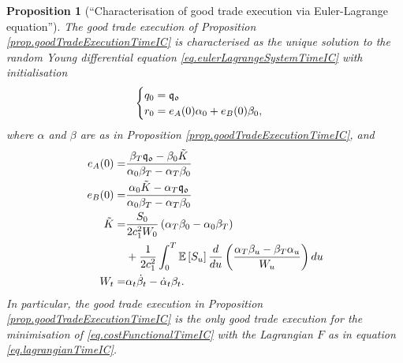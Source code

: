 \documentclass[10pt,a4paper]{article}
\newtheorem{prop}[thm]{Proposition}
\begin{document}
	\begin{prop} [``Characterisation of good trade execution via Euler-Lagrange equation''] \label{prop.characterisationEulerLagrangeTimeIC}
		The good trade execution of Proposition \ref{prop.goodTradeExecutionTimeIC} is characterised as the unique solution to the random Young differential equation \eqref{eq.eulerLagrangeSystemTimeIC} with initialisation
		\begin{equation*}
		\begin{cases}
		q_0 = \mathfrak{q_0} \\
		r_0 = e_A(0) \alpha_0 + e_B (0) \beta_0,
		\end{cases}
		\end{equation*}
		where $\alpha$ and $\beta$ are as in Proposition \ref{prop.goodTradeExecutionTimeIC}, and 
		\begin{equation*}
		\begin{split}
		e_A (0) =& \frac{ \beta_T \mathfrak{q_0} - \beta_0 \tilde{K}}{\alpha_0\beta_T - \alpha_T \beta_0} \\
		e_B (0) =& \frac{\alpha_0 \tilde{K} - \alpha_T \mathfrak{q_0}}{\alpha_0\beta_T - \alpha_T \beta_0} \\
		\tilde{K} = & \frac{S_0}{2c_{1}^{2} W_0}\left(\alpha_T \beta_0 - \alpha_0 \beta_T \right) \\
		& + \frac{1}{2c_{1}^{2}} \int_{0}^{T} \mathbb{{E}}\left[S_u\right] 
		\frac{d}{d u} \left(\frac{\alpha_T \beta_u - \beta_T \alpha_u}{W_u}\right) du \\
		W_t = & \alpha_t \dot{\beta}_t - \dot{\alpha}_t \beta_t. 
		\end{split}
		\end{equation*}
		In particular, the good trade execution in Proposition \ref{prop.goodTradeExecutionTimeIC} is the only good trade execution for the minimisation of \eqref{eq.costFunctionalTimeIC} with the Lagrangian $F$ as in equation \eqref{eq.lagrangianTimeIC}.
	\end{prop}
\end{document}
